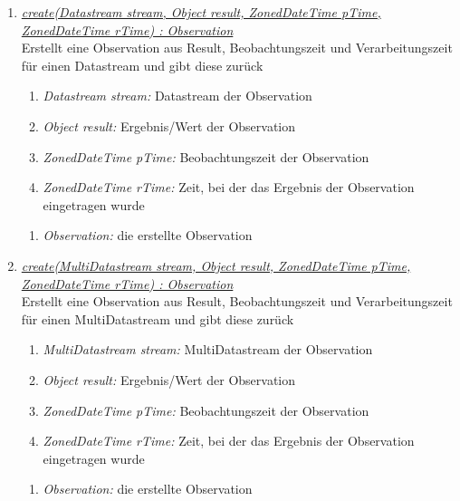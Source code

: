 \begin{enumerate}[+]
\item \underline{\textit{create(Datastream stream, Object result, ZonedDateTime pTime,}}\\
\underline{\textit{ ZonedDateTime rTime) : Observation}}\\
Erstellt eine Observation aus Result, Beobachtungszeit und Verarbeitungszeit für einen Datastream und gibt diese zurück

\begin{enumerate}[$\bullet$]
\item \textit{Datastream stream:} Datastream der Observation
\item \textit{Object result:} Ergebnis/Wert der Observation
\item \textit{ZonedDateTime pTime:} Beobachtungszeit der Observation
\item \textit{ZonedDateTime rTime:} Zeit, bei der das Ergebnis der Observation eingetragen wurde
\end{enumerate}
\vspace{-0.2cm}
\begin{enumerate}[$\circ$]
\item \textit{Observation:} die erstellte Observation
\end{enumerate}


\item \underline{\textit{create(MultiDatastream stream, Object result, ZonedDateTime pTime,}}\\
\underline{\textit{ZonedDateTime rTime) : Observation}}\\
Erstellt eine Observation aus Result, Beobachtungszeit und Verarbeitungszeit für einen MultiDatastream und gibt diese zurück

\begin{enumerate}[$\bullet$]
\item \textit{MultiDatastream stream:} MultiDatastream der Observation
\item \textit{Object result:} Ergebnis/Wert der Observation
\item \textit{ZonedDateTime pTime:} Beobachtungszeit der Observation
\item \textit{ZonedDateTime rTime:} Zeit, bei der das Ergebnis der Observation eingetragen wurde
\end{enumerate}
\vspace{-0.2cm}
\begin{enumerate}[$\circ$]
\item \textit{Observation:} die erstellte Observation
\end{enumerate}


\end{enumerate}
